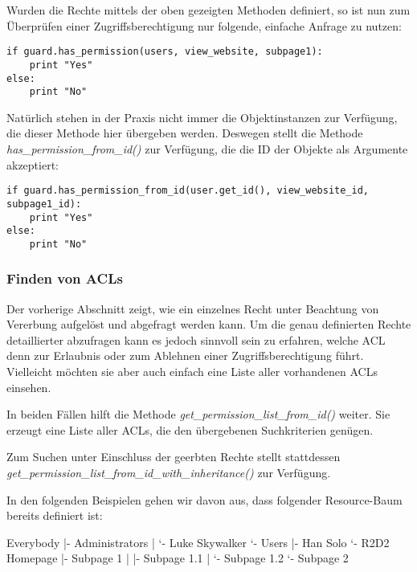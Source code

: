 Wurden die Rechte mittels der oben gezeigten Methoden definiert, so ist nun 
zum Überprüfen einer Zugriffsberechtigung nur folgende, einfache Anfrage 
zu nutzen:

\begin{lstlisting}
if guard.has_permission(users, view_website, subpage1):
    print "Yes"
else:
    print "No"
\end{lstlisting}

Natürlich stehen in der Praxis nicht immer die Objektinstanzen zur 
Verfügung, die dieser Methode hier übergeben werden. Deswegen stellt 
\product die Methode {\it has\_permission\_from\_id()} zur Verfügung, 
die die ID der Objekte als Argumente akzeptiert:

\begin{lstlisting}
if guard.has_permission_from_id(user.get_id(), view_website_id, subpage1_id):
    print "Yes"
else:
    print "No"
\end{lstlisting}


\subsubsection{Finden von ACLs}

Der vorherige Abschnitt zeigt, wie ein einzelnes Recht unter Beachtung von 
Vererbung aufgelöst und abgefragt werden kann. Um die genau definierten 
Rechte detaillierter abzufragen kann es jedoch sinnvoll sein zu erfahren, 
welche ACL denn zur Erlaubnis oder zum Ablehnen einer Zugriffsberechtigung 
führt. Vielleicht möchten sie aber auch einfach eine Liste aller vorhandenen 
ACLs einsehen.

In beiden Fällen hilft die Methode {\it get\_permission\_list\_from\_id()} 
weiter. Sie erzeugt eine Liste aller ACLs, die den übergebenen Suchkriterien 
genügen.


Zum Suchen unter Einschluss der geerbten Rechte stellt \product stattdessen 
{\it get\_permission\_list\_from\_id\_with\_inheritance()} zur Verfügung.

In den folgenden Beispielen gehen wir davon aus, dass folgender 
Resource-Baum bereits definiert ist:

\begin{indentverb}
Everybody
  |- Administrators
  |   `- Luke Skywalker
  `- Users
      |- Han Solo
      `- R2D2
Homepage
  |- Subpage 1
  |   |- Subpage 1.1
  |   `- Subpage 1.2
  `- Subpage 2
\end{indentverb}


